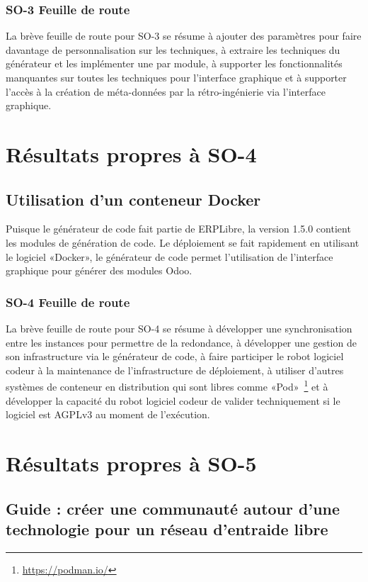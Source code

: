 \subsubsection{SO-3 Feuille de route}
La brève feuille de route pour SO-3 se résume à ajouter des paramètres pour faire davantage de personnalisation sur les techniques, à extraire les techniques du générateur et les implémenter une par module, à supporter les fonctionnalités manquantes sur toutes les techniques pour l’interface graphique et à supporter l’accès à la création de méta-données par la rétro-ingénierie via l’interface graphique.

\section{Résultats propres à SO-4}

\subsection{Utilisation d’un conteneur Docker}

Puisque le générateur de code fait partie de ERPLibre, la version 1.5.0 contient les modules de génération de code. Le déploiement se fait rapidement en utilisant le logiciel «Docker», le générateur de code permet l’utilisation de l’interface graphique pour générer des modules Odoo.

\subsubsection{SO-4 Feuille de route}
La brève feuille de route pour SO-4 se résume à développer une synchronisation entre les instances pour permettre de la redondance, à développer une gestion de son infrastructure via le générateur de code, à faire participer le robot logiciel codeur à la maintenance de l’infrastructure de déploiement, à utiliser d’autres systèmes de conteneur en distribution qui sont libres comme «Pod»~\footnote{\url{https://podman.io/}} et à développer la capacité du robot logiciel codeur de valider techniquement si le logiciel est AGPLv3 au moment de l’exécution.

\section{Résultats propres à SO-5}

\subsection{Guide : créer une communauté autour d’une technologie pour un réseau d’entraide libre}

